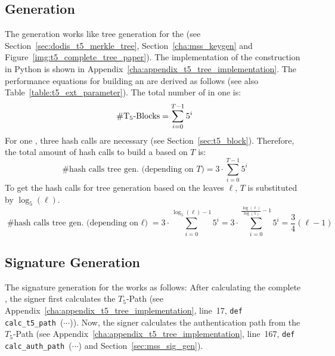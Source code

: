 \subsection{\texorpdfstring{\extree}{Ext. T5-Tree} Generation}
\label{sec:extree_sign_gen}
The \extree generation works like tree generation for the \tftree (see Section~\ref{sec:dodis_t5_merkle_tree}, Section~\ref{cha:mss_keygen} and Figure~\ref{img:t5_complete_tree_paper}). The implementation of the \extree construction in Python is shown in Appendix~\ref{cha:appendix_t5_tree_implementation}.
The performance equations for building an \extree are derived as follows (see also Table~\ref{table:t5_ext_parameter}). The total number of \tfblocks in one \extree is:
\begin{equation}
\text{\#T$_5$-Blocks} = \sum_{i=0}^{T-1} 5^i
\end{equation} 
For one \tfblock, three hash calls are necessary (see Section~\ref{sec:t5_block}). Therefore, the total amount of hash calls to build a \extree based on $T$ is:\\
\begin{equation}
\text{\# hash calls tree gen. (depending on $T$)} = 3 \cdot \sum_{i=0}^{T-1} 5^i
\end{equation}
To get the hash calls for tree generation based on the leaves $\ell$, $T$ is substituted by $\log_5(\ell)$.
\begin{equation}
\label{eq:t5_tree_gen_hashcalls}
\text{\# hash calls tree gen. (depending on $\ell$)}=3 \cdot \sum_{i=0}^{\log_5(\ell)-1} 5^i = 3 \cdot \sum_{i=0}^{\frac{\log(\ell)}{\log(5)}-1} 5^i = \frac{3}{4} (\ell-1)
\end{equation}

\subsection{\texorpdfstring{\extree}{Ext. T5-Tree} Signature Generation}
The signature generation for the \extree works as follows: After calculating the complete \extree, the signer first calculates the $T_5$-Path (see Appendix~\ref{cha:appendix_t5_tree_implementation}, line~17, \texttt{def calc_t5_path}~($\cdots$)).
Now, the signer calculates the authentication path from the $T_5$-Path (see Appendix~\ref{cha:appendix_t5_tree_implementation}, line~167, \texttt{def calc_auth_path}~($\cdots$) and Section~\ref{sec:mss_sig_gen}).


